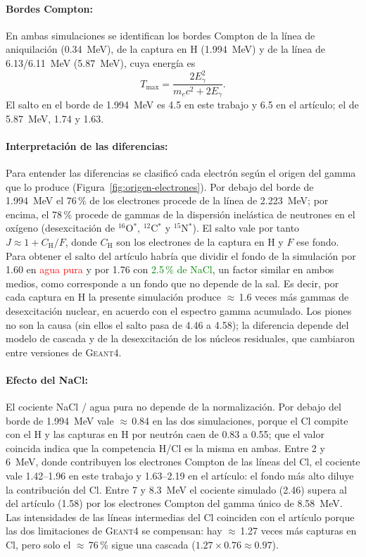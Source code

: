 \paragraph{Bordes Compton:} En ambas simulaciones se identifican los bordes Compton de la línea de aniquilación (0.34~MeV), de la captura en H (1.994~MeV) y de la línea de 6.13/6.11~MeV (5.87~MeV), cuya energía es
\begin{equation}
	T_{\max} = \frac{2E_{\gamma}^{2}}{m_{e}c^{2}+2E_{\gamma}} .
\end{equation}
El salto en el borde de 1.994~MeV es 4.5 en este trabajo y 6.5 en el artículo; el de 5.87~MeV, 1.74 y 1.63.

\paragraph{Interpretación de las diferencias:} Para entender las diferencias se clasificó cada electrón según el origen del gamma que lo produce (Figura~\ref{fig:origen-electrones}). Por debajo del borde de 1.994~MeV el 76\,\% de los electrones procede de la línea de 2.223~MeV; por encima, el 78\,\% procede de gammas de la dispersión inelástica de neutrones en el oxígeno (desexcitación de $^{16}$O$^{*}$, $^{12}$C$^{*}$ y $^{15}$N$^{*}$). El salto vale por tanto $J\approx1+C_{\mathrm{H}}/F$, donde $C_{\mathrm{H}}$ son los electrones de la captura en H y $F$ ese fondo. Para obtener el salto del artículo habría que dividir el fondo de la simulación por 1.60 en \textcolor{red}{agua pura} y por 1.76 con \textcolor{green}{2.5\,\% de NaCl}, un factor similar en ambos medios, como corresponde a un fondo que no depende de la sal. Es decir, por cada captura en H la presente simulación produce $\approx$\,1.6 veces más gammas de desexcitación nuclear, en acuerdo con el espectro gamma acumulado. Los piones no son la causa (sin ellos el salto pasa de 4.46 a 4.58); la diferencia depende del modelo de cascada y de la desexcitación de los núcleos residuales, que cambiaron entre versiones de \textsc{Geant4}.

\paragraph{Efecto del NaCl:} El cociente NaCl / agua pura no depende de la normalización. Por debajo del borde de 1.994~MeV vale $\approx$\,0.84 en las dos simulaciones, porque el Cl compite con el H y las capturas en H por neutrón caen de 0.83 a 0.55; que el valor coincida indica que la competencia H/Cl es la misma en ambas. Entre 2 y 6~MeV, donde contribuyen los electrones Compton de las líneas del Cl, el cociente vale 1.42--1.96 en este trabajo y 1.63--2.19 en el artículo: el fondo más alto diluye la contribución del Cl. Entre 7 y 8.3~MeV el cociente simulado (2.46) supera al del artículo (1.58) por los electrones Compton del gamma único de 8.58~MeV. Las intensidades de las líneas intermedias del Cl coinciden con el artículo porque las dos limitaciones de \textsc{Geant4} se compensan: hay $\approx$\,1.27 veces más capturas en Cl, pero solo el $\approx$\,76\,\% sigue una cascada ($1.27\times0.76\approx0.97$).

